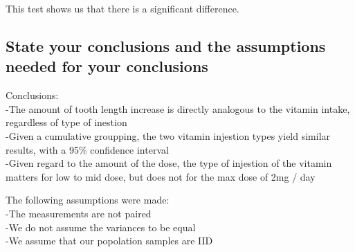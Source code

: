 \documentclass[]{article}
\begin{document}
This test shows us that there is a significant difference.

\hypertarget{state-your-conclusions-and-the-assumptions-needed-for-your-conclusions}{%
\subsection{State your conclusions and the assumptions needed for your
conclusions}\label{state-your-conclusions-and-the-assumptions-needed-for-your-conclusions}}

Conclusions:\\
-The amount of tooth length increase is directly analogous to the
vitamin intake, regardless of type of inestion\\
-Given a cumulative groupping, the two vitamin injestion types yield
similar results, with a 95\% confidence interval\\
-Given regard to the amount of the dose, the type of injestion of the
vitamin matters for low to mid dose, but does not for the max dose of
2mg / day

The following assumptions were made:\\
-The measurements are not paired\\
-We do not assume the variances to be equal\\
-We assume that our popolation samples are IID
\end{document}
